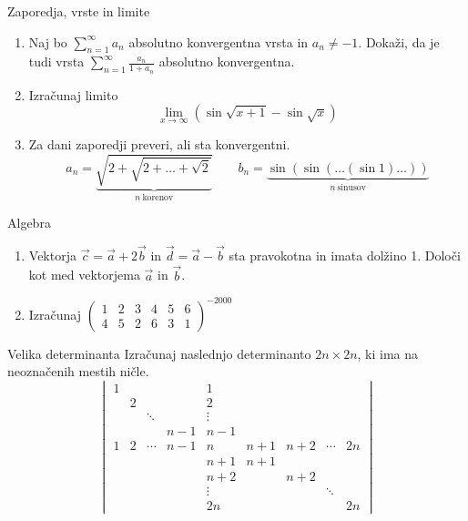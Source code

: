 \begin{frame}{Zaporedja, vrste in limite}
	\begin{enumerate}
		\item 
		Naj bo $\sum_{n=1}^\infty a_n$ absolutno konvergentna vrsta in $a_n \ne -1$.
		Dokaži, da je tudi vrsta $\sum_{n=1}^\infty \frac{a_n}{1+a_n}$
		absolutno konvergentna.

		\item
		Izračunaj limito
		$$\lim_{x \to \infty} (\sin \sqrt{x+1} -\sin\sqrt{x})$$

		\item
		Za dani zaporedji preveri, ali sta konvergentni.
		$$
		a_n = \underbrace{\sqrt{2+\sqrt{2+\dots+\sqrt{2}}}}_{n~\text{korenov}} \qquad
	    b_n = \underbrace{\sin(\sin(\dots(\sin 1)\dots))}_{n~\text{sinusov}}
		$$
		
	\end{enumerate}
\end{frame}

\begin{frame}{Algebra}
	\begin{enumerate}
		\item
		Vektorja $\vec{c} =\vec{a} + 2\vec{b}$ in $\vec{d}=\vec{a}-\vec{b}$
		sta pravokotna in imata dolžino 1. Določi kot med vektorjema $\vec{a}$ in $\vec{b}$.
		\item 
		Izračunaj
		$ \displaystyle{\begin{pmatrix}1&2&3&4&5&6\\4&5&2&6&3&1\end{pmatrix}^{-2000}}$
		
	\end{enumerate}
\end{frame}

\begin{frame}{Velika determinanta}
	Izračunaj naslednjo determinanto $2n \times 2n$, ki ima na neoznačenih mestih ničle.
	$$
		\begin{vmatrix}
			1 &&&& 1 &&&& \\
			& 2 &&& 2 &&&& \\
			&& \ddots && \vdots &&&& \\
			&&& n-1 & n-1 &&&& \\
			1 & 2 & \cdots & n-1 & n & n+1 & n+2 & \cdots & 2n \\
			&&&& n+1 & n+1 &&& \\
			&&&& n+2 && n+2 && \\
			&&&& \vdots &&& \ddots & \\
			&&&& 2n &&&& 2n
		\end{vmatrix}
	$$
\end{frame}

